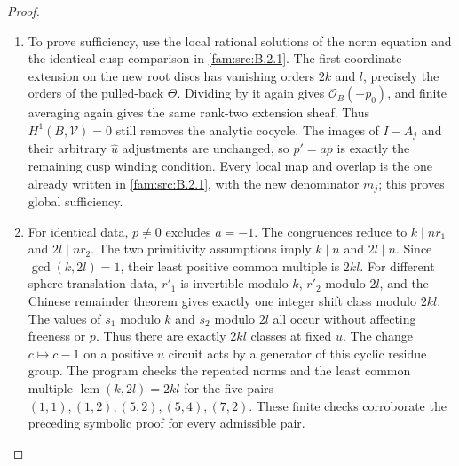 \begin{proof}
\begin{enumerate}[label=\arabic*.,leftmargin=*]
\item To prove sufficiency, use the local rational solutions of the norm equation and the identical cusp comparison in \ref{fam:src:B.2.1}. The first-coordinate extension on the new root discs has vanishing orders $2k$ and $l$, precisely the orders of the pulled-back $\Theta$. Dividing by it again gives $\mathcal O_B(-p_0)$, and finite averaging again gives the same rank-two extension sheaf. Thus $H^1(B,\mathcal V)=0$ still removes the analytic cocycle. The images of $I-A_j$ and their arbitrary $\widehat u$ adjustments are unchanged, so $p'=ap$ is exactly the remaining cusp winding condition. Every local map and overlap is the one already written in \ref{fam:src:B.2.1}, with the new denominator $m_j$; this proves global sufficiency.

\item For identical data, $p\ne0$ excludes $a=-1$. The congruences reduce to $k\mid nr_1$ and $2l\mid nr_2$. The two primitivity assumptions imply $k\mid n$ and $2l\mid n$. Since $\gcd(k,2l)=1$, their least positive common multiple is $2kl$. For different sphere translation data, $r'_1$ is invertible modulo $k$, $r'_2$ modulo $2l$, and the Chinese remainder theorem gives exactly one integer shift class modulo $2kl$. The values of $s_1$ modulo $k$ and $s_2$ modulo $2l$ all occur without affecting freeness or $p$. Thus there are exactly $2kl$ classes at fixed $u$. The change $c\mapsto c-1$ on a positive $u$ circuit acts by a generator of this cyclic residue group. The program
 checks the repeated norms and the least common multiple $\operatorname{lcm}(k,2l)=2kl$ for the five pairs $(1,1),(1,2),(5,2),(5,4),(7,2)$. These finite checks corroborate the preceding symbolic proof for every admissible pair.
\end{enumerate}
\end{proof}